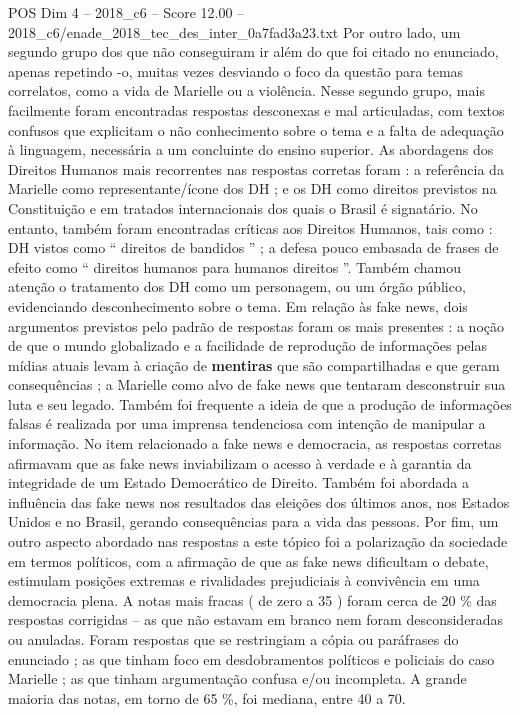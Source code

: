 \begin{textsample}{POS Dim 4 – 2018\_c6 – Score 12.00 – 2018\_c6/enade\_2018\_tec\_des\_inter\_0a7fad3a23.txt}
Por outro lado, um segundo grupo dos que não conseguiram ir além do que foi citado no enunciado, apenas repetindo -o, muitas vezes desviando o foco da questão para temas correlatos, como a vida de Marielle ou a violência.
Nesse segundo grupo, mais facilmente foram encontradas respostas desconexas e mal articuladas, com textos confusos que explicitam o não conhecimento sobre o tema e a falta de adequação à linguagem, necessária a um concluinte do ensino superior.
As abordagens dos Direitos Humanos mais recorrentes nas respostas corretas foram : a referência da Marielle como representante/ícone dos DH ; e os DH como direitos previstos na Constituição e em tratados internacionais dos quais o Brasil é signatário.
No entanto, também foram encontradas críticas aos Direitos Humanos, tais como : DH vistos como “ direitos de bandidos ” ; a defesa pouco embasada de frases de efeito como “ direitos humanos para humanos direitos ”.
Também chamou atenção o tratamento dos DH como um personagem, ou um órgão público, evidenciando desconhecimento sobre o tema.
Em relação às fake news, dois argumentos previstos pelo padrão de respostas foram os mais presentes : a noção de que o mundo globalizado e a facilidade de reprodução de informações pelas mídias atuais levam à criação de \textbf{mentiras} que são compartilhadas e que geram consequências ; a Marielle como alvo de fake news que tentaram desconstruir sua luta e seu legado.
Também foi frequente a ideia de que a produção de informações falsas é realizada por uma imprensa tendenciosa com intenção de manipular a informação.
No item relacionado a fake news e democracia, as respostas corretas afirmavam que as fake news inviabilizam o acesso à verdade e à garantia da integridade de um Estado Democrático de Direito.
Também foi abordada a influência das fake news nos resultados das eleições dos últimos anos, nos Estados Unidos e no Brasil, gerando consequências para a vida das pessoas.
Por fim, um outro aspecto abordado nas respostas a este tópico foi a polarização da sociedade em termos políticos, com a afirmação de que as fake news dificultam o debate, estimulam posições extremas e rivalidades prejudiciais à convivência em uma democracia plena.
A notas mais fracas ( de zero a 35 ) foram cerca de 20 \% das respostas corrigidas – as que não estavam em branco nem foram desconsideradas ou anuladas.
Foram respostas que se restringiam a cópia ou paráfrases do enunciado ; as que tinham foco em desdobramentos políticos e policiais do caso Marielle ; as que tinham argumentação confusa e/ou incompleta.
A grande maioria das notas, em torno de 65 \%, foi mediana, entre 40 a 70.

\end{textsample}
